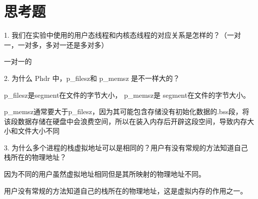 \documentclass{source/Report}
\begin{document}
\section{思考题}

1. 我们在实验中使用的用户态线程和内核态线程的对应关系是怎样的？（一对一，一对多，多对一还是多对多）

   一对一的

2. 为什么 Phdr 中，p\_filesz和 p\_memsz 是不一样大的？

   p\_filesz是segment在文件的字节大小， p\_memsz是 segment在文件的字节大小。

   p\_memsz通常要大于p\_filesz，因为其可能包含存储没有初始化数据的.bss段，将该段数据存储在硬盘中会浪费空间，所以在装入内存后开辟这段空间，导致内存大小和文件大小不同

3. 为什么多个进程的栈虚拟地址可以是相同的？用户有没有常规的方法知道自己栈所在的物理地址？

   因为不同的用户虽然虚拟地址相同但是其所映射的物理地址不同。

   用户没有常规的方法知道自己的栈所在的物理地址，这是虚拟内存的作用之一。
\end{document}
